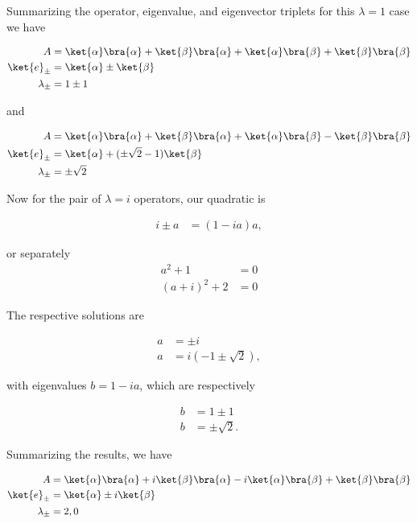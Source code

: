 Summarizing the operator, eigenvalue, and eigenvector triplets for this $\lambda = 1$ case we have

\begin{align}\label{eqn:desaiDiracNotes:67}
A &=
\ket{\alpha}\bra{\alpha}
+ \ket{\beta}\bra{\alpha}
+ \ket{\alpha}\bra{\beta}
+ \ket{\beta}\bra{\beta} \\
\ket{e}_{\pm} &= \ket{\alpha} \pm \ket{\beta} \\
\lambda_{\pm} &= 1 \pm 1 
\end{align}

and

\begin{align}\label{eqn:desaiDiracNotes:68}
A &=
\ket{\alpha}\bra{\alpha}
+ \ket{\beta}\bra{\alpha}
+ \ket{\alpha}\bra{\beta}
- \ket{\beta}\bra{\beta} \\
\ket{e}_{\pm} &= \ket{\alpha} + (\pm \sqrt{2} - 1) \ket{\beta} \\
\lambda_{\pm} &= \pm \sqrt{2}
\end{align}

Now for the pair of $\lambda = i$ operators, our quadratic is

\begin{align}\label{eqn:desaiDiracNotes:64i}
i \pm a &= (1 - i a) a,
\end{align}

or separately
\begin{align}\label{eqn:desaiDiracNotes:64ii}
a^2 + 1 &= 0 \\
(a + i)^2 + 2 &= 0
\end{align}

The respective solutions are

\begin{align}\label{eqn:desaiDiracNotes:66i}
a &= \pm i \\
a &= i (-1 \pm \sqrt{2} ),
\end{align}

with eigenvalues $b = 1 - i a$, which are respectively

\begin{align}\label{eqn:desaiDiracNotes:66j}
b &= 1 \pm 1 \\
b &= \pm \sqrt{2}.
\end{align}

Summarizing the results, we have

\begin{align}\label{eqn:desaiDiracNotes:67ip}
A &=
\ket{\alpha}\bra{\alpha}
+ i \ket{\beta}\bra{\alpha}
- i \ket{\alpha}\bra{\beta}
+ \ket{\beta}\bra{\beta} \\
\ket{e}_{\pm} &= \ket{\alpha} \pm i \ket{\beta} \\
\lambda_{\pm} &= 2, 0
\end{align}

